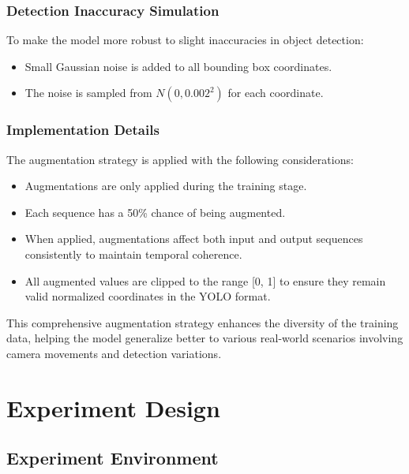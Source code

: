 \documentclass[12pt,oneside]{book} %
\begin{document}
\subsection{Detection Inaccuracy Simulation}

To make the model more robust to slight inaccuracies in object detection:

\begin{itemize}
    \item Small Gaussian noise is added to all bounding box coordinates.
    \item The noise is sampled from $N(0, 0.002^2)$ for each coordinate.
\end{itemize}

\subsection{Implementation Details}

The augmentation strategy is applied with the following considerations:

\begin{itemize}
    \item Augmentations are only applied during the training stage.
    \item Each sequence has a 50\% chance of being augmented.
    \item When applied, augmentations affect both input and output sequences consistently
          to maintain temporal coherence.
    \item All augmented values are clipped to the range [0, 1] to ensure they remain
          valid normalized coordinates in the YOLO format.
\end{itemize}

This comprehensive augmentation strategy enhances the diversity of the training
data, helping the model generalize better to various real-world scenarios
involving camera movements and detection variations.

\chapter{Experiment Design}
\section{Experiment Environment}
\end{document}
